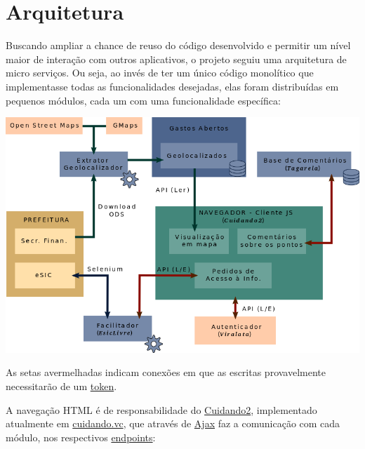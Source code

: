 \documentclass[letterpaper,10pt,english]{sphinxmanual}
\begin{document}
\chapter{Arquitetura}
\label{index:arquitetura}
Buscando ampliar a chance de reuso do código desenvolvido e permitir um nível
maior de interação com outros aplicativos, o projeto seguiu uma arquitetura de
micro serviços. Ou seja, ao invés de ter um único código monolítico que
implementasse todas as funcionalidades desejadas, elas foram distribuídas em
pequenos módulos, cada um com uma funcionalidade específica:

\includegraphics{cuidando2_arq2-827px.png}

As setas avermelhadas indicam conexões em que as escritas provavelmente
necessitarão de um
\href{https://github.com/okfn-brasil/viralata\#protocol}{token}.

A navegação HTML é de responsabilidade do \href{https://github.com/okfn-brasil/cuidando2}{Cuidando2}, implementado
atualmente em \href{https://cuidando.vc}{cuidando.vc}, que através de
\href{https://en.wikipedia.org/wiki/Ajax\_(programming)}{Ajax} faz a
comunicação com cada módulo, nos respectivos
\href{http://www.w3.org/TR/wsdl20/\#Endpoint}{endpoints}:
\end{document}
